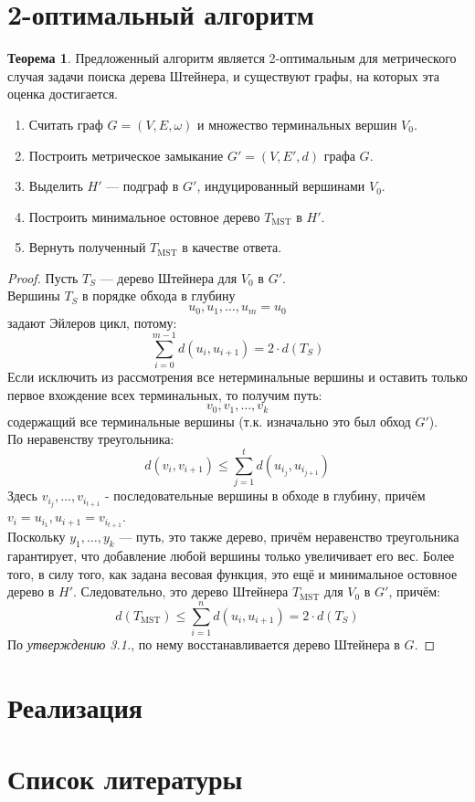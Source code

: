\documentclass[11pt,a4paper]{report}
\def\le{\leqslant}
\theoremstyle{definition}
\theoremstyle{definition}
\newtheorem{theorem}{Теорема}[section]
\theoremstyle{definition}
\begin{document}
	\section{2-оптимальный алгоритм}
	\begin{theorem}
		Предложенный алгоритм является 2-оптимальным для метрического случая задачи поиска дерева Штейнера, и существуют графы, на которых эта оценка достигается.
		\begin{enumerate}
			\item Считать граф $G = (V, E, \omega)$ и множество терминальных вершин $V_0$.
			\item Построить метрическое замыкание $G' = (V, E', d)$ графа $G$.
			\item Выделить $H'$ — подграф в $G'$, индуцированный вершинами $V_0$. 
			\item Построить минимальное остовное дерево $T_{\mathrm{MST}}$ в $H'$.
			\item Вернуть полученный $T_{\mathrm{MST}} $ в качестве ответа.
		\end{enumerate}
	\end{theorem}
	\begin{proof}
		Пусть $T_{S}$ — дерево Штейнера для $V_0$ в $G'$.\\
		Вершины $T_{S}$ в порядке обхода в глубину
		$$
			u_0, u_1, \ldots, u_m = u_0
		$$ 
		задают Эйлеров цикл, потому:
		$$ 
			\sum_{i=0}^{m-1} d(u_i, u_{i+1}) = 2 \cdot d(T_{S})
		$$
		Если исключить из рассмотрения все нетерминальные вершины и оставить только первое вхождение всех терминальных, то получим путь:
		$$
			v_0, v_1, \ldots, v_k
		$$
		содержащий все терминальные вершины (т.к. изначально это был обход $G'$).\\ 
		По неравенству треугольника:
		$$
			d(v_i, v_{i+1}) \le \sum_{j=1}^{t} d(u_{i_j}, u_{i_{j+1}})
		$$
		Здесь $v_{i_{j}}, \ldots, v_{i_{t+1}}$ - последовательные вершины в обходе в глубину, причём $v_i = u_{i_{1}}, u_{i+1} = v_{i_{t+1}}$.\\
		Поскольку $y_1, \ldots, y_k$ — путь, это также дерево, причём неравенство треугольника гарантирует, что добавление любой вершины только увеличивает его вес. Более того, в силу того, как задана весовая функция, это ещё и минимальное остовное дерево в $H'$. Следовательно, это дерево Штейнера $T_{\mathrm{MST}}$ для $V_0$ в $G'$, причём:
		$$
			d(T_{\mathrm{MST}}) \le \sum_{i=1}^{n} d(u_i, u_{i+1}) = 2 \cdot d(T_{S})
		$$
		По \textit{утверждению 3.1.}, по нему восстанавливается дерево Штейнера в $G$.
	\end{proof}
	\section{Реализация}
	\section{Список литературы}
\end{document}
